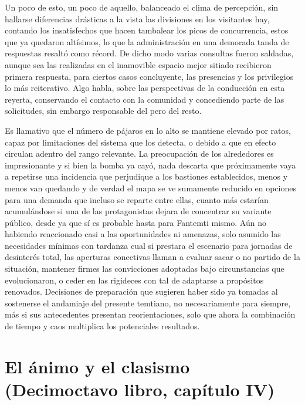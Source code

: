 \documentclass[
]{book}
\begin{document}
Un poco de esto, un poco de aquello, balanceado el clima de percepción, sin hallarse diferencias drásticas a la vista las divisiones en los visitantes hay, contando los insatisfechos que hacen tambalear los picos de concurrencia, estos que ya quedaron altísimos, lo que la administración en una demorada tanda de respuestas resaltó como récord. De dicho modo varias consultas fueron saldadas, aunque sea las realizadas en el inamovible espacio mejor sitiado recibieron primera respuesta, para ciertos casos concluyente, las presencias y los privilegios lo más reiterativo. Algo habla, sobre las perspectivas de la conducción en esta reyerta, conservando el contacto con la comunidad y concediendo parte de las solicitudes, sin embargo responsable del pero del resto.

Es llamativo que el número de pájaros en lo alto se mantiene elevado por ratos, capaz por limitaciones del sistema que los detecta, o debido a que en efecto circulan adentro del rango relevante. La preocupación de los alrededores es impresionante y si bien la bomba ya cayó, nada descarta que próximamente vaya a repetirse una incidencia que perjudique a los bastiones establecidos, menos y menos van quedando y de verdad el mapa se ve sumamente reducido en opciones para una demanda que incluso se reparte entre ellas, cuanto más estarían acumulándose si una de las protagonistas dejara de concentrar su variante público, desde ya que sí es probable hasta para Fantemti mismo. Aún no habiendo reaccionado casi a las oportunidades ni amenazas, solo asumido las necesidades mínimas con tardanza cual si prestara el escenario para jornadas de desinterés total, las aperturas conectivas llaman a evaluar sacar o no partido de la situación, mantener firmes las convicciones adoptadas bajo circunstancias que evolucionaron, o ceder en las rigideces con tal de adaptarse a propósitos renovados. Decisiones de preparación que sugieren haber sido ya tomadas al sostenerse el andamiaje del presente temtiano, no necesariamente para siempre, más si sus antecedentes presentan reorientaciones, solo que ahora la combinación de tiempo y caos multiplica los potenciales resultados.

\hypertarget{el-uxe1nimo-y-el-clasismo-decimoctavo-libro-capuxedtulo-iv}{%
\section{El ánimo y el clasismo (Decimoctavo libro, capítulo IV)}\label{el-uxe1nimo-y-el-clasismo-decimoctavo-libro-capuxedtulo-iv}}
\end{document}
